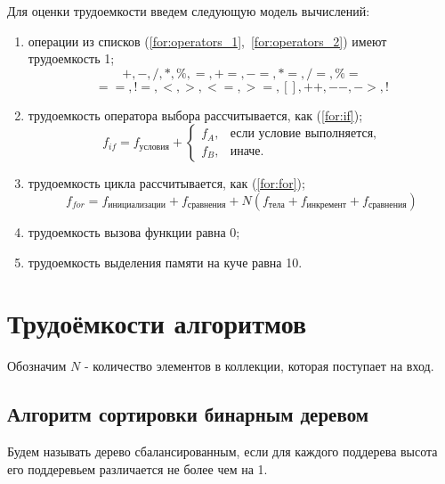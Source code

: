 Для оценки трудоемкости введем следующую модель вычислений:
\begin{enumerate}
    \item операции из списков (\ref{for:operators_1},~\ref{for:operators_2}) имеют трудоемкость 1;
    \begin{equation}
        \label{for:operators_1}
        +, -, /, *, \%, =, +=, -=, *=, /=, \%=
    \end{equation}
    \begin{equation}
        \label{for:operators_2}
        ==, !=, <, >, <=, >=, [], ++, {-}-, ->, !
    \end{equation}
    \item трудоемкость оператора выбора  рассчитывается, как (\ref{for:if});
    \begin{equation}
        \label{for:if}
        f_{if} = f_{\text{условия}} +
        \begin{cases}
            f_A, & \text{если условие выполняется,}\\
            f_B, & \text{иначе.}
        \end{cases}
    \end{equation}
    \item трудоемкость цикла рассчитывается, как (\ref{for:for});
    \begin{equation}
        \label{for:for}
        f_{for} = f_{\text{инициализации}} + f_{\text{сравнения}} + N(f_{\text{тела}} + f_{\text{инкремент}} + f_{\text{сравнения}})
    \end{equation}
    \item трудоемкость вызова функции равна 0;
    \item трудоемкость выделения памяти на куче равна 10.
\end{enumerate}

\section{Трудоёмкости алгоритмов}

Обозначим $N$ - количество элементов в коллекции, которая поступает на вход.

\subsection{Алгоритм сортировки бинарным деревом}

Будем называть дерево сбалансированным, если для каждого поддерева
высота его поддеревьем различается не более чем на 1.


